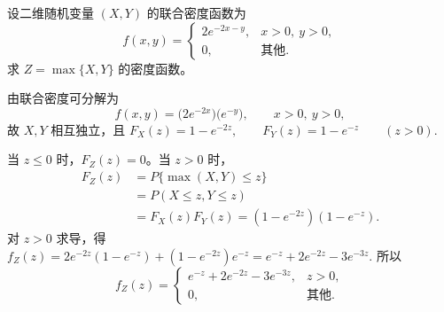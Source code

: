 \documentclass[lang=cn,11pt]{elegantbook}
\begin{document}
\begin{exercise}\label{exer:src-2008-probstat-2a-v-01}\label{exer:src-paper3-iv-03}\label{prob:p3-iv-03}
设二维随机变量 \((X,Y)\) 的联合密度函数为
\[
f(x,y)=
\begin{cases}
2e^{-2x-y},&x>0,\ y>0,\\
0,&\text{其他}.
\end{cases}
\]
求 \(Z=\max\{X,Y\}\) 的密度函数。
\end{exercise}
\begin{solution}
由联合密度可分解为
\[
f(x,y)=\bigl(2e^{-2x}\bigr)\bigl(e^{-y}\bigr),\qquad x>0,\ y>0,
\]
故 \(X,Y\) 相互独立，且
\(
F_X(z)=1-e^{-2z},\qquad F_Y(z)=1-e^{-z}\qquad (z>0).
\)

当 \(z\le0\) 时，\(F_Z(z)=0\)。当 \(z>0\) 时，
\[
\begin{aligned}
F_Z(z)
&=P\{\max(X,Y)\le z\}\\
&=P(X\le z,Y\le z)\\
&=F_X(z)F_Y(z)
=(1-e^{-2z})(1-e^{-z}).
\end{aligned}
\]
对 \(z>0\) 求导，得
\(
f_Z(z)=2e^{-2z}(1-e^{-z})+(1-e^{-2z})e^{-z}
=e^{-z}+2e^{-2z}-3e^{-3z}.
\)
所以
\[
f_Z(z)=
\begin{cases}
e^{-z}+2e^{-2z}-3e^{-3z},&z>0,\\
0,&\text{其他}.
\end{cases}
\]
\end{solution}
\end{document}
